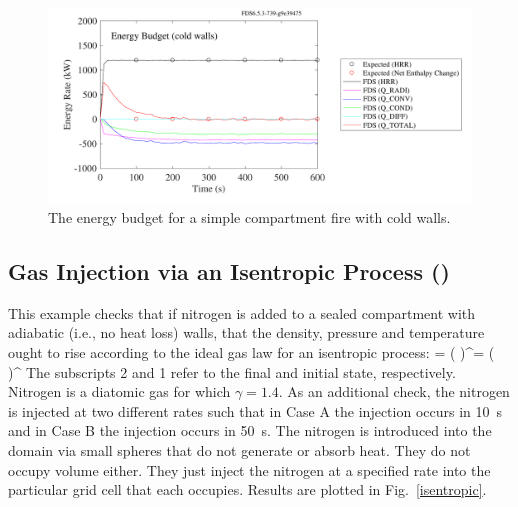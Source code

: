 \documentclass[11pt]{book}
\begin{document}
\begin{figure}[ht]
\centering
\includegraphics[width=.9\textwidth]{SCRIPT_FIGURES/energy_budget_cold_walls}
\caption[Energy Budget (cold walls)]{The energy budget for a simple compartment fire with cold walls.}
\label{energy_budget_cold_walls}
\end{figure}


\subsection{Gas Injection via an Isentropic Process (\texorpdfstring{}{isentropic})}

This example checks that if nitrogen is added to a sealed compartment with adiabatic (i.e., no heat loss) walls, that the
density, pressure and temperature ought to rise according to the ideal gas law for an isentropic process:
\be {} = \left(  \right)^\gamma = \left(  \right)^{}  \ee
The subscripts 2 and 1 refer to the final and initial state, respectively. Nitrogen is a diatomic gas for which $\gamma=1.4$. As an additional
check, the nitrogen is injected at two different rates such that in Case A the injection occurs in 10~s and in Case B the injection occurs in
50~s. The nitrogen is introduced into the domain via small spheres that do not generate or absorb heat. They do not occupy volume either. They just
inject the nitrogen at a specified rate into the particular grid cell that each occupies.  Results are plotted in Fig.~\ref{isentropic}.
\end{document}
